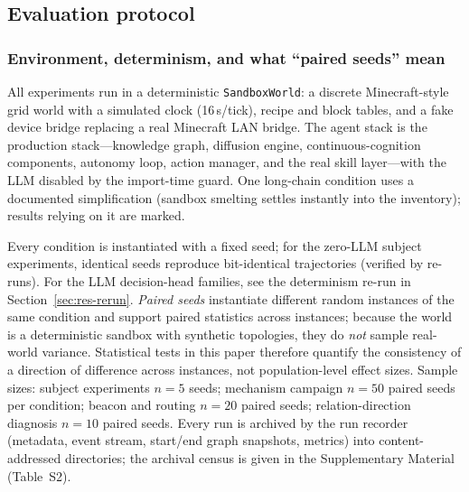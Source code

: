 \documentclass[10pt]{article}
\begin{document}
\subsection{Evaluation protocol}
\label{sec:method}

\subsubsection{Environment, determinism, and what ``paired seeds'' mean}
\label{sec:method-env}
All experiments run in a deterministic \texttt{SandboxWorld}: a discrete Minecraft-style grid world with a simulated clock (16\,s/tick), recipe and block tables, and a fake device bridge replacing a real Minecraft LAN bridge. The agent stack is the production stack---knowledge graph, diffusion engine, continuous-cognition components, autonomy loop, action manager, and the real skill layer---with the LLM disabled by the import-time guard. One long-chain condition uses a documented simplification (sandbox smelting settles instantly into the inventory); results relying on it are marked.

Every condition is instantiated with a fixed seed; for the zero-LLM subject experiments, identical seeds reproduce bit-identical trajectories (verified by re-runs). For the LLM decision-head families, see the determinism re-run in Section~\ref{sec:res-rerun}. \emph{Paired seeds} instantiate different random instances of the same condition and support paired statistics across instances; because the world is a deterministic sandbox with synthetic topologies, they do \emph{not} sample real-world variance. Statistical tests in this paper therefore quantify the consistency of a direction of difference across instances, not population-level effect sizes. Sample sizes: subject experiments $n{=}5$ seeds; mechanism campaign $n{=}50$ paired seeds per condition; beacon and routing $n{=}20$ paired seeds; relation-direction diagnosis $n{=}10$ paired seeds. Every run is archived by the run recorder (metadata, event stream, start/end graph snapshots, metrics) into content-addressed directories; the archival census is given in the Supplementary Material (Table~S2).
\end{document}
